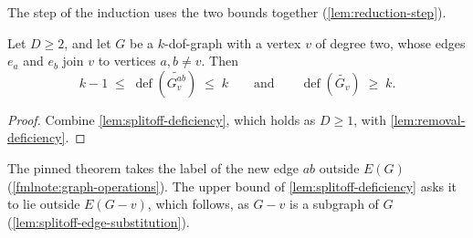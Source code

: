 The step of the induction uses the two bounds together
(\cref{lem:reduction-step}).

\begin{lemma}
  \label{lem:dof-tracking}
  \leanok
  Let $D \ge 2$, and let $G$ be a $k$-dof-graph with a vertex $v$ of
  degree two, whose edges $e_a$ and $e_b$ join $v$ to vertices
  $a, b \neq v$. Then
  \[
    k - 1 \;\le\; \operatorname{def}(\widetilde{G_v^{ab}}) \;\le\; k
    \qquad\text{and}\qquad
    \operatorname{def}(\widetilde{G_v}) \;\ge\; k.
  \]
\end{lemma}
\begin{proof}
  \leanok
  Combine \cref{lem:splitoff-deficiency}, which holds as $D \ge 1$, with
  \cref{lem:removal-deficiency}.
\end{proof}
\begin{fmlnote}
  The pinned theorem takes the label of the new edge $ab$ outside
  $E(G)$ (\cref{fmlnote:graph-operations}). The upper bound of
  \cref{lem:splitoff-deficiency} asks it to lie outside $E(G - v)$,
  which follows, as $G - v$ is a subgraph of $G$
  (\cref{lem:splitoff-edge-substitution}).
\end{fmlnote}

